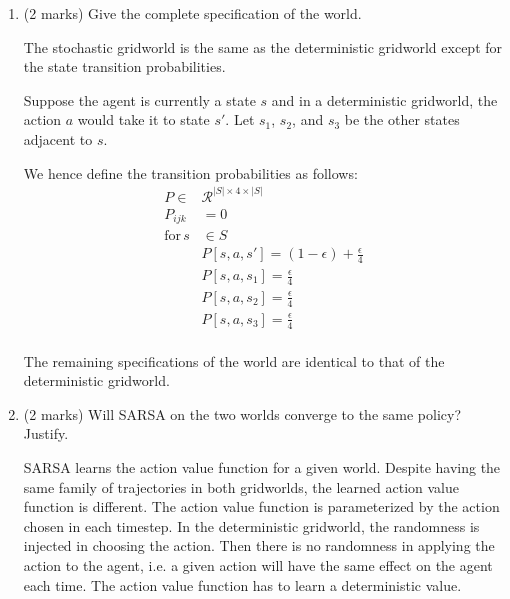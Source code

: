 \documentclass[addpoints,12pt,solution]{exam}
\begin{document}
\begin{questions}
        \begin{enumerate}[label=(\alph*)]

            \item (2 marks) Give the complete specification of the world.

            \begin{solution}
                The stochastic gridworld is the same as the deterministic gridworld except for the state transition probabilities.

                Suppose the agent is currently a state $s$ and in a deterministic gridworld, the action $a$ would take it to state $s'$.
                Let $s_1$, $s_2$, and $s_3$ be the other states adjacent to $s$.

                We hence define the transition probabilities as follows:
                \begin{align*}
                    P \in &\mathcal{R}^{|S| \times 4 \times |S|}\\
                    P_{ijk} &= {0} \\
                    \text{for} \, s &\in S\\
                    &P[s, a, s'] = (1-\epsilon) + \frac{\epsilon}{4} \\
                    &P[s, a, s_1] = \frac{\epsilon}{4} \\
                    &P[s, a, s_2] = \frac{\epsilon}{4} \\
                    &P[s, a, s_3] = \frac{\epsilon}{4} \\
                \end{align*}

                The remaining specifications of the world are identical to that of the deterministic gridworld.

            \end{solution}


            \item (2 marks) Will SARSA on the two worlds converge to the same policy? Justify.

            \begin{solution}
                SARSA learns the action value function for a given world. Despite having the same family of trajectories in both gridworlds, the learned action value function is different.
                The action value function is parameterized by the action chosen in each timestep. In the deterministic gridworld, the randomness is injected in choosing the action.
                Then there is no randomness in applying the action to the agent, i.e. a given action will have the same effect on the agent each time.
                The action value function has to learn a deterministic value.


\end{solution}
\end{enumerate}
\end{questions}
\end{document}
